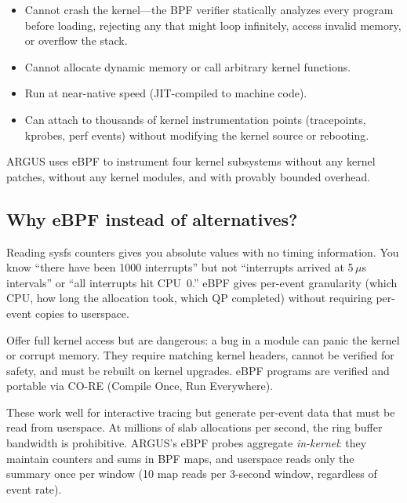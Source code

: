 \documentclass[11pt]{article}
\begin{document}
\begin{itemize}[nosep]
  \item Cannot crash the kernel---the BPF verifier statically analyzes every
        program before loading, rejecting any that might loop infinitely,
        access invalid memory, or overflow the stack.
  \item Cannot allocate dynamic memory or call arbitrary kernel functions.
  \item Run at near-native speed (JIT-compiled to machine code).
  \item Can attach to thousands of kernel instrumentation points
        (tracepoints, kprobes, perf events) without modifying the kernel
        source or rebooting.
\end{itemize}

ARGUS uses eBPF to instrument four kernel subsystems without any kernel
patches, without any kernel modules, and with provably bounded overhead.

\subsection{Why eBPF instead of alternatives?}

\begin{description}[style=nextline,leftmargin=0.5cm]
  \item[\texttt{/proc} and \texttt{/sys} polling]
    Reading sysfs counters gives you absolute values with no timing
    information. You know ``there have been 1000 interrupts'' but not
    ``interrupts arrived at 5\,$\mu$s intervals'' or ``all interrupts hit
    CPU~0.'' eBPF gives per-event granularity (which CPU, how long the
    allocation took, which QP completed) without requiring per-event copies
    to userspace.
  \item[Kernel modules]
    Offer full kernel access but are dangerous: a bug in a module can panic
    the kernel or corrupt memory. They require matching kernel headers,
    cannot be verified for safety, and must be rebuilt on kernel upgrades.
    eBPF programs are verified and portable via CO-RE (Compile Once, Run
    Everywhere).
  \item[perf / ftrace]
    These work well for interactive tracing but generate per-event data that
    must be read from userspace. At millions of slab allocations per second,
    the ring buffer bandwidth is prohibitive. ARGUS's eBPF probes aggregate
    \emph{in-kernel}: they maintain counters and sums in BPF maps, and
    userspace reads only the summary once per window (10 map reads per
    3-second window, regardless of event rate).
\end{description}
\end{document}
